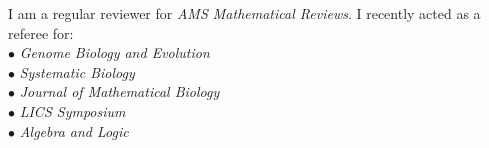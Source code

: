 \documentclass[12pt]{article}
\begin{document}
\noindent I am a regular reviewer for {\em AMS Mathematical Reviews}.
I recently acted as a referee for:
\medskip\\
$\bullet$ {\em Genome Biology and Evolution}\\
$\bullet$ {\em Systematic Biology}\\
$\bullet$ {\em Journal of Mathematical Biology}\\
$\bullet$ {\em LICS Symposium}\\
$\bullet$ {\em Algebra and Logic}
\vskip30pt
\iftoggle{full}{
\begin{tabbing}
0000000000000000000	\= 0000000000000000000000000000000000000000000	\= \kill
Up-to-date full CV:	\> \url{http://alex.gavruskin.com/AGcv.pdf}\\
			\> \\
Up-to-date short CV:	\> \url{http://alex.gavruskin.com/AGcv_short.pdf}
\end{tabbing}
}{
\noindent Up-to-date CV: \url{http://alex.gavruskin.com/AGcv_short.pdf}
}
\end{document}
